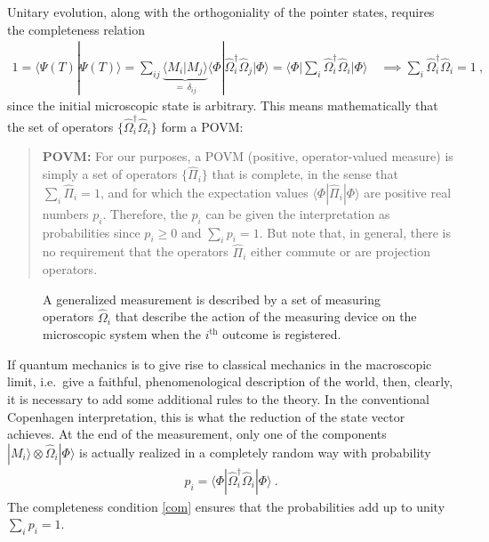 \documentclass[12pt]{article}
\theoremstyle{plain}
\theoremstyle{definition}
\theoremstyle{remark}
\def\bra#1{\langle #1|}
\def\ket#1{| #1\rangle}
\newcommand{\EQ}[1]{\begin{equation}\begin{split} #1
\end{split}\end{equation}}
\begin{document}
Unitary evolution, along with the orthogoniality of the pointer states, requires the completeness relation
\EQ{
1=\bra{\Psi(T)}\Psi(T)\rangle=\sum_{ij}\underbrace{\bra{M_i}M_j\rangle}_{=\,\delta_{ij}}\bra{\Phi}\hat \Omega_i^\dagger\hat \Omega_j\ket{\Phi}
=\bra{\Phi}\sum_i\hat \Omega_i^\dagger\hat \Omega_i\ket{\Phi}
\quad\implies \sum_i\hat\Omega_i^\dagger\hat\Omega_i=1\ ,
\label{com}
}
since the initial microscopic state is arbitrary.
This means mathematically that the set of operators $\{\hat\Omega_i^\dagger\hat\Omega_i\}$ form a POVM: 
\begin{quote}{\bf POVM:} For our purposes, a POVM (positive, operator-valued measure) is simply a set of operators $\{\hat\Pi_i\}$ that is complete, in the sense that $\sum_i\hat\Pi_i=1$, and for which the expectation values $\bra{\Phi}\hat\Pi_i\ket{\Phi}$ are positive real numbers $p_i$. Therefore, the $p_i$ can be given the interpretation as probabilities since $p_i\geq0$ and $\sum_ip_i=1$. But note that, in general, there is no requirement that the operators $\hat\Pi_i$ either commute or are projection operators.
\end{quote}
\begin{figure}[ht]
\begin{center}
\end{center}
\caption{A generalized measurement is described by a set of measuring operators $\hat\Omega_i$ that describe the action of the measuring device on the microscopic system when the $i^\text{th}$ outcome is registered.}
\label{f2}
\end{figure}

If quantum mechanics is to give rise to classical mechanics in the macroscopic limit, i.e.~give a faithful, phenomenological description of the world, then, clearly, it is necessary to add some additional rules to the theory. In the conventional Copenhagen interpretation, this is what the reduction of the state vector achieves. 
At the end of the measurement, only one of the components $\ket{M_i}\otimes\hat\Omega_i\ket{\Phi}$ is actually realized in a completely random way with probability
\EQ{
p_i=\bra{\Phi}\hat\Omega_i^\dagger\hat\Omega_i\ket{\Phi}\ .
\label{ppr}
}
The completeness condition \eqref{com} ensures that the probabilities add up to unity $\sum_ip_i=1$. 
\end{document}
